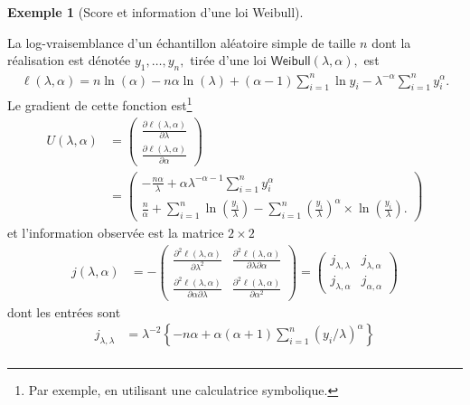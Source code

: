 \documentclass[
  11pt,
  letterpaper,
]{scrbook}
\theoremstyle{plain}
\theoremstyle{plain}
\theoremstyle{definition}
\newtheorem{example}{Exemple}[chapter]
\theoremstyle{definition}
\theoremstyle{remark}
\begin{document}
\begin{example}[Score et information d'une loi
Weibull]\protect\hypertarget{exm-weibull-emv}{}\label{exm-weibull-emv}

La log-vraisemblance d'un échantillon aléatoire simple de taille \(n\)
dont la réalisation est dénotée \(y_1, \ldots, y_n,\) tirée d'une loi
\(\mathsf{Weibull}(\lambda, \alpha),\) est \begin{align*}
\ell(\lambda, \alpha) = n \ln(\alpha) - n\alpha\ln(\lambda) + (\alpha-1) \sum_{i=1}^n \ln y_i  - \lambda^{-\alpha}\sum_{i=1}^n y_i^\alpha.
\end{align*} Le gradient de cette fonction est\footnote{Par exemple, en
  utilisant une calculatrice symbolique.} \begin{align*}
U(\lambda, \alpha) &= \begin{pmatrix}\frac{\partial \ell(\lambda, \alpha)}{\partial \lambda} \\
\frac{\partial \ell(\lambda, \alpha)}{\partial \alpha} \end{pmatrix} 
\\&= 
\begin{pmatrix}
 -\frac{n\alpha}{\lambda} +\alpha\lambda^{-\alpha-1}\sum_{i=1}^n y_i^\alpha
 \\
 \frac{n}{\alpha} + \sum_{i=1}^n \ln\left(\frac{y_i}{\lambda}\right)  - \sum_{i=1}^n \left(\frac{y_i}{\lambda}\right)^{\alpha} \times\ln\left(\frac{y_i}{\lambda}\right).
 \end{pmatrix}
\end{align*} et l'information observée est la matrice \(2 \times 2\)
\begin{align*}
j(\lambda, \alpha) &= - \begin{pmatrix}
\frac{\partial^2 \ell(\lambda, \alpha)}{\partial \lambda^2} &  \frac{\partial^2 \ell(\lambda, \alpha)}{\partial \lambda \partial \alpha} \\ \frac{\partial^2 \ell(\lambda, \alpha)}{\partial \alpha \partial \lambda} & \frac{\partial^2 \ell(\lambda, \alpha)}{\partial \alpha^2}
\end{pmatrix}  = \begin{pmatrix} j_{\lambda, \lambda} & j_{\lambda, \alpha} \\ j_{\lambda, \alpha} & j_{\alpha, \alpha} \end{pmatrix}
\end{align*} dont les entrées sont \begin{align*}
j_{\lambda, \lambda} &= \lambda^{-2}\left\{-n\alpha + \alpha(\alpha+1)\sum_{i=1}^n (y_i/\lambda)^\alpha\right\} \\

\end{align*}
\end{example}
\end{document}
